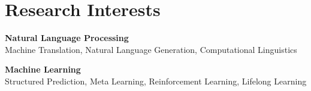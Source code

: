 
\section{\sc Research Interests}

{\bf Natural Language Processing} \\
Machine Translation,
Natural Language Generation,
Computational Linguistics

{\bf Machine Learning} \\
Structured Prediction,
Meta Learning,
Reinforcement Learning,
Lifelong Learning
